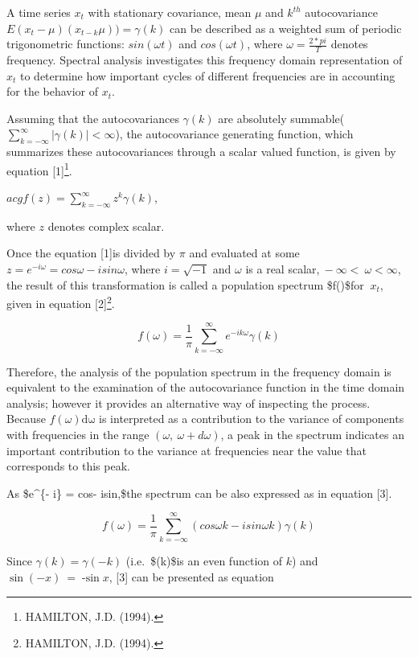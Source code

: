 \documentclass[
  letterpaper,
  DIV=11,
  numbers=noendperiod]{scrreprt}
\begin{document}
A time series \(x_{t}\) with stationary covariance, mean \(μ\) and
\(k^{th}\) autocovariance \(E(x_{t}-\mu)(x_{t- k}\mu))=\gamma(k)\) can
be described as a weighted sum of periodic trigonometric functions:
\(sin(\omega t)\) and \(cos(\omega t)\), where \(\omega=\frac{2*pi}{T}\)
denotes frequency. Spectral analysis investigates this frequency domain
representation of \(x_{t}\) to determine how important cycles of
different frequencies are in accounting for the behavior of \(x_{t}\).

Assuming that the autocovariances \(\gamma(k)\) are absolutely
summable(\(\sum_{k =-\infty}^{\infty}|\gamma(k)|<\infty\)), the
autocovariance generating function, which summarizes these
autocovariances through a scalar valued function, is given by equation
{[}1{]}\footnote{HAMILTON, J.D. (1994).}.

\(acgf(z)=\sum_{k=-\infty}^{\infty}{z^{k}\gamma(k)}\),

where \(z\) denotes complex scalar.

Once the equation {[}1{]}is divided by \(\pi\) and evaluated at some
\(z{= e}^{- i\omega} = cos\omega - isin\omega\), where
\(i = \sqrt{- 1}\) and \(\omega\) is a real
scalar,\(\  - \infty < \ \omega < \infty\), the result of this
transformation is called a population spectrum \$f(\omega)\$for
\(\ x_{t}\), given in equation {[}2{]}\footnote{HAMILTON, J.D. (1994).}.

\[f(\omega) = \frac{1}{\pi}\sum_{k = - \infty}^{\infty}{e^{- ik\omega}\gamma(k)}\]

Therefore, the analysis of the population spectrum in the frequency
domain is equivalent to the examination of the autocovariance function
in the time domain analysis; however it provides an alternative way of
inspecting the process. Because \(f(\omega)\text{dω}\) is interpreted as
a contribution to the variance of components with frequencies in the
range \((\omega,\ \omega + d\omega)\), a peak in the spectrum indicates
an important contribution to the variance at frequencies near the value
that corresponds to this peak.

As \$e\^{}\{- i\omega\} = cos\omega - isin\omega,\$the spectrum can be
also expressed as in equation {[}3{]}.

\[f(\omega) = \frac{1}{\pi}\sum_{k = - \infty}^{\infty}{(cos\omega k - isin\omega k)\gamma(k)}\]

Since \(\gamma(k) = \gamma( - k)\) (i.e.~\$\gamma(k)\$is an even
function of \(k\)) and \(\sin{( - x)}\  = \operatorname{-sin}x\),
{[}3{]} can be presented as equation
\end{document}
